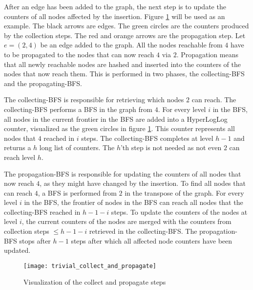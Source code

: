 After an edge has been added to the graph, the next step is to update the counters of all nodes affected by the insertion. Figure \ref{fig:collect_and_propagate} will be used as an example. The black arrows are edges. The green circles are the counters produced by the collection steps. The red and orange arrows are the propagation step. Let $e = (2,4)$ be an edge added to the graph. All the nodes reachable from $4$ have to be propagated to the nodes that can now reach $4$ via $2$. Propagation means that all newly reachable nodes are hashed and inserted into the counters of the nodes that now reach them. This is performed in two phases, the collecting-BFS and the propagating-BFS.

The collecting-BFS is responsible for retrieving which nodes $2$ can reach. The collecting-BFS performs a BFS in the graph from $4$. For every level $i$ in the BFS, all nodes in the current frontier in the BFS are added into a HyperLogLog counter, visualized as the green circles in figure \ref{fig:collect_and_propagate}. This counter represents all nodes that $4$ reached in $i$ steps. The collecting-BFS completes at level $h-1$ and returns a $h$ long list of counters. The $h$'th step is not needed as not even $2$ can reach level $h$.

The propagation-BFS is responsible for updating the counters of all nodes that now reach $4$, as they might have changed by the insertion. To find all nodes that can reach $4$, a BFS is performed from $2$ in the transpose of the graph. For every level $i$ in the BFS, the frontier of nodes in the BFS can reach all nodes that the collecting-BFS reached in $h-1-i$ steps. To update the counters of the nodes at level $i$, the current counters of the nodes are merged with the counters from collection steps $\leq h-1-i$ retrieved in the collecting-BFS. The propagation-BFS stops after $h-1$ steps after which all affected node counters have been updated.\\

\begin{figure}[h]
\centering
\texttt{[image: trivial\_collect\_and\_propagate]}    
\captionsetup{justification=centering}
\caption {Visualization of the collect and propagate steps}
\label{fig:collect_and_propagate}
\end{figure}

